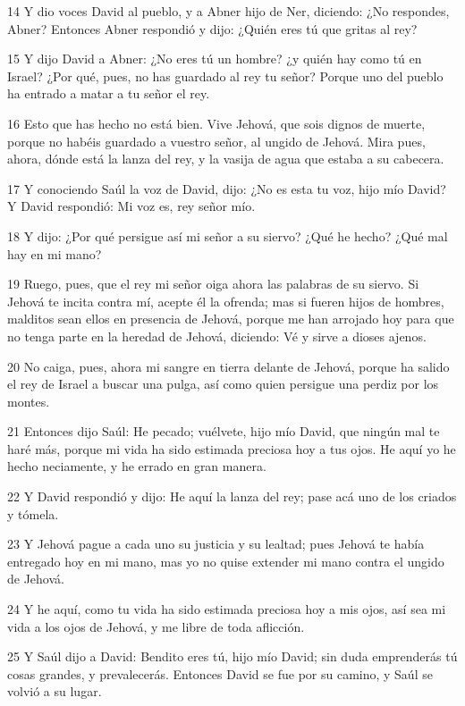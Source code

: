 \par 14 Y dio voces David al pueblo, y a Abner hijo de Ner, diciendo: ¿No respondes, Abner? Entonces Abner respondió y dijo: ¿Quién eres tú que gritas al rey?
\par 15 Y dijo David a Abner: ¿No eres tú un hombre? ¿y quién hay como tú en Israel? ¿Por qué, pues, no has guardado al rey tu señor? Porque uno del pueblo ha entrado a matar a tu señor el rey.
\par 16 Esto que has hecho no está bien. Vive Jehová, que sois dignos de muerte, porque no habéis guardado a vuestro señor, al ungido de Jehová. Mira pues, ahora, dónde está la lanza del rey, y la vasija de agua que estaba a su cabecera.
\par 17 Y conociendo Saúl la voz de David, dijo: ¿No es esta tu voz, hijo mío David? Y David respondió: Mi voz es, rey señor mío.
\par 18 Y dijo: ¿Por qué persigue así mi señor a su siervo? ¿Qué he hecho? ¿Qué mal hay en mi mano?
\par 19 Ruego, pues, que el rey mi señor oiga ahora las palabras de su siervo. Si Jehová te incita contra mí, acepte él la ofrenda; mas si fueren hijos de hombres, malditos sean ellos en presencia de Jehová, porque me han arrojado hoy para que no tenga parte en la heredad de Jehová, diciendo: Vé y sirve a dioses ajenos.
\par 20 No caiga, pues, ahora mi sangre en tierra delante de Jehová, porque ha salido el rey de Israel a buscar una pulga, así como quien persigue una perdiz por los montes.
\par 21 Entonces dijo Saúl: He pecado; vuélvete, hijo mío David, que ningún mal te haré más, porque mi vida ha sido estimada preciosa hoy a tus ojos. He aquí yo he hecho neciamente, y he errado en gran manera.
\par 22 Y David respondió y dijo: He aquí la lanza del rey; pase acá uno de los criados y tómela.
\par 23 Y Jehová pague a cada uno su justicia y su lealtad; pues Jehová te había entregado hoy en mi mano, mas yo no quise extender mi mano contra el ungido de Jehová.
\par 24 Y he aquí, como tu vida ha sido estimada preciosa hoy a mis ojos, así sea mi vida a los ojos de Jehová, y me libre de toda aflicción.
\par 25 Y Saúl dijo a David: Bendito eres tú, hijo mío David; sin duda emprenderás tú cosas grandes, y prevalecerás. Entonces David se fue por su camino, y Saúl se volvió a su lugar.

